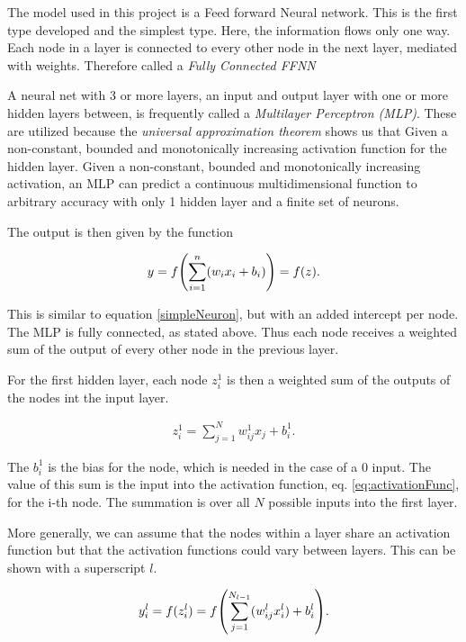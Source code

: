 \documentclass[10pt]{article}
\begin{document}
The model used in this project is a Feed forward Neural network. This is the
first type developed and the simplest type. Here, the information flows only
one way. Each node in a layer is connected to every other node in the next
layer, mediated with weights. Therefore called a \emph{Fully Connected FFNN}

A neural net with 3 or more layers, an input and output layer with one or more
hidden layers between, is frequently called a \emph{Multilayer Perceptron
(MLP)}. These are utilized because the \emph{universal approximation theorem}
shows us that Given a non-constant, bounded and monotonically increasing
activation function for the hidden layer.  Given a non-constant, bounded and
monotonically increasing activation, an MLP can predict a continuous
multidimensional function to arbitrary accuracy with only 1 hidden layer and a
finite set of neurons.

The output is then given by the function 

\begin{align}
	y = f\qty(\sum_{i=1}^n(w_ix_i + b_i)) = f(z)
	\label{eq:activationFunc}.
\end{align}

This is similar to equation \ref{simpleNeuron}, but with an added intercept per
node. The MLP is fully connected, as stated above. Thus each node receives a
weighted sum of the output of every other node in the previous layer. 

For the first hidden layer, each node $z^1_i$ is then a weighted sum of the
outputs of the nodes int the input layer. 

\begin{align}
	z^1_i = \sum_{j=1}^N w^1_{ij}x_j + b_i^1
	\label{eq:nodeInput}.
\end{align}

The $b^1_i$ is the bias for the node, which is needed in the case of a 0 input.
The value of this sum is the input into the activation function, eq.
\ref{eq:activationFunc}, for the i-th node. The summation is over all $N$
possible inputs into the first layer.

More generally, we can assume that the nodes within a layer share an activation function
but that the activation functions could vary between layers. This can be shown with a superscript
$l$.

\begin{align}
	y^l_i = f(z^l_i) = f\qty(\sum_{j=1}^{N_{l-1}}( w^l_{ij}x^l_i ) + b^l_i ).
\end{align}
\end{document}
